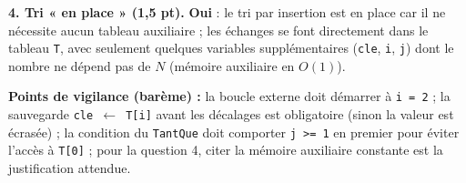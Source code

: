 \documentclass[11pt]{article}
\newcommand{\cle}[1]{{\popxbold\color{popdark}#1}}
\begin{document}
\begin{corrige}
\textbf{4. Tri « en place » (1,5 pt).} \textbf{Oui} : le tri par insertion est \cle{en place} car il ne nécessite aucun tableau auxiliaire ; les échanges se font directement dans le tableau \texttt{T}, avec seulement quelques variables supplémentaires (\texttt{cle}, \texttt{i}, \texttt{j}) dont le nombre ne dépend pas de $N$ (mémoire auxiliaire en $O(1)$).

\textbf{Points de vigilance (barème) :} la boucle externe doit démarrer à \texttt{i = 2} ; la sauvegarde \texttt{cle $\leftarrow$ T[i]} avant les décalages est obligatoire (sinon la valeur est écrasée) ; la condition du \texttt{TantQue} doit comporter \texttt{j >= 1} en premier pour éviter l'accès à \texttt{T[0]} ; pour la question 4, citer la mémoire auxiliaire constante est la justification attendue.
\end{corrige}
\end{document}
